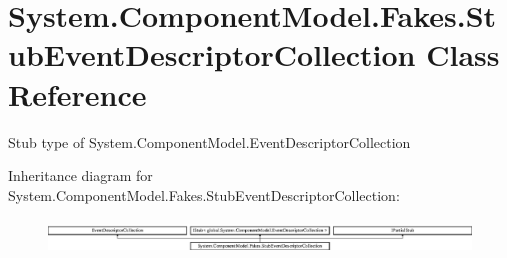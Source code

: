 \hypertarget{class_system_1_1_component_model_1_1_fakes_1_1_stub_event_descriptor_collection}{\section{System.\-Component\-Model.\-Fakes.\-Stub\-Event\-Descriptor\-Collection Class Reference}
\label{class_system_1_1_component_model_1_1_fakes_1_1_stub_event_descriptor_collection}
}


Stub type of System.\-Component\-Model.\-Event\-Descriptor\-Collection 


Inheritance diagram for System.\-Component\-Model.\-Fakes.\-Stub\-Event\-Descriptor\-Collection\-:\begin{figure}[H]
\begin{center}
\leavevmode
\includegraphics[height=0.926385cm]{class_system_1_1_component_model_1_1_fakes_1_1_stub_event_descriptor_collection}
\end{center}
\end{figure}
